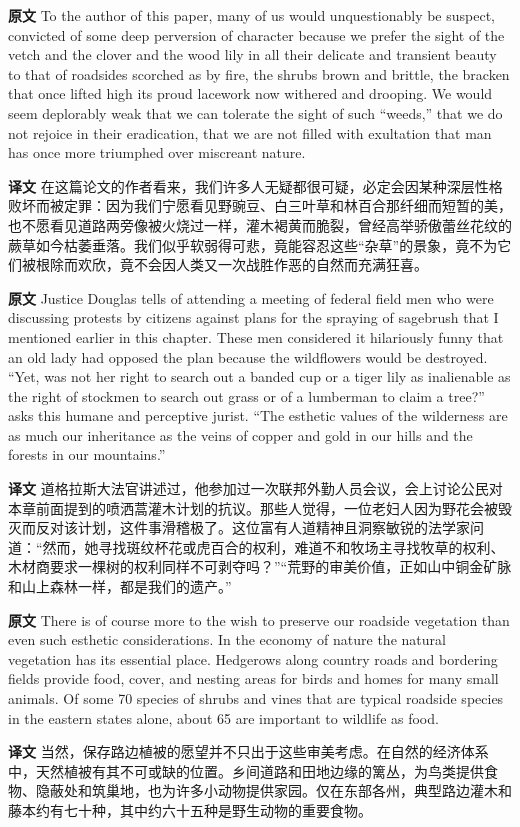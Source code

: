 \documentclass[UTF8,zihao=-4]{ctexart}
\begin{document}
\noindent\textbf{原文} To the author of this paper, many of us would unquestionably be suspect, convicted of some deep perversion of character because we prefer the sight of the vetch and the clover and the wood lily in all their delicate and transient beauty to that of roadsides scorched as by fire, the shrubs brown and brittle, the bracken that once lifted high its proud lacework now withered and drooping. We would seem deplorably weak that we can tolerate the sight of such ``weeds,'' that we do not rejoice in their eradication, that we are not filled with exultation that man has once more triumphed over miscreant nature.
\par
\noindent\textbf{译文} 在这篇论文的作者看来，我们许多人无疑都很可疑，必定会因某种深层性格败坏而被定罪：因为我们宁愿看见野豌豆、白三叶草和林百合那纤细而短暂的美，也不愿看见道路两旁像被火烧过一样，灌木褐黄而脆裂，曾经高举骄傲蕾丝花纹的蕨草如今枯萎垂落。我们似乎软弱得可悲，竟能容忍这些“杂草”的景象，竟不为它们被根除而欢欣，竟不会因人类又一次战胜作恶的自然而充满狂喜。
\par\medskip

\noindent\textbf{原文} Justice Douglas tells of attending a meeting of federal field men who were discussing protests by citizens against plans for the spraying of sagebrush that I mentioned earlier in this chapter. These men considered it hilariously funny that an old lady had opposed the plan because the wildflowers would be destroyed. ``Yet, was not her right to search out a banded cup or a tiger lily as inalienable as the right of stockmen to search out grass or of a lumberman to claim a tree?'' asks this humane and perceptive jurist. ``The esthetic values of the wilderness are as much our inheritance as the veins of copper and gold in our hills and the forests in our mountains.''
\par
\noindent\textbf{译文} 道格拉斯大法官讲述过，他参加过一次联邦外勤人员会议，会上讨论公民对本章前面提到的喷洒蒿灌木计划的抗议。那些人觉得，一位老妇人因为野花会被毁灭而反对该计划，这件事滑稽极了。这位富有人道精神且洞察敏锐的法学家问道：“然而，她寻找斑纹杯花或虎百合的权利，难道不和牧场主寻找牧草的权利、木材商要求一棵树的权利同样不可剥夺吗？”“荒野的审美价值，正如山中铜金矿脉和山上森林一样，都是我们的遗产。”
\par\medskip

\noindent\textbf{原文} There is of course more to the wish to preserve our roadside vegetation than even such esthetic considerations. In the economy of nature the natural vegetation has its essential place. Hedgerows along country roads and bordering fields provide food, cover, and nesting areas for birds and homes for many small animals. Of some 70 species of shrubs and vines that are typical roadside species in the eastern states alone, about 65 are important to wildlife as food.
\par
\noindent\textbf{译文} 当然，保存路边植被的愿望并不只出于这些审美考虑。在自然的经济体系中，天然植被有其不可或缺的位置。乡间道路和田地边缘的篱丛，为鸟类提供食物、隐蔽处和筑巢地，也为许多小动物提供家园。仅在东部各州，典型路边灌木和藤本约有七十种，其中约六十五种是野生动物的重要食物。
\par\medskip
\end{document}
